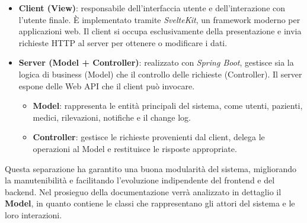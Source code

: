 \documentclass[a4paper]{article}
\begin{document}
\begin{itemize}
  \item \textbf{Client (View)}: responsabile dell’interfaccia utente e dell’interazione con 
  l’utente finale. È implementato tramite \textit{SvelteKit}, un framework moderno per applicazioni web. 
  Il client si occupa esclusivamente della presentazione e invia richieste HTTP al server per ottenere 
  o modificare i dati.
  \item \textbf{Server (Model + Controller)}: realizzato con \textit{Spring Boot}, gestisce sia 
  la logica di business (Model) che il controllo delle richieste (Controller). Il server espone delle 
  Web API che il client può invocare.
  \begin{itemize}
    \item \textbf{Model}: rappresenta le entità principali del sistema, come utenti, pazienti, medici, 
    rilevazioni, notifiche e il change log.
    \item \textbf{Controller}: gestisce le richieste provenienti dal client, delega 
    le operazioni al Model e restituisce le risposte appropriate.
  \end{itemize}
\end{itemize}
\noindent
Questa separazione ha garantito una buona modularità del sistema, migliorando la manutenibilità e 
facilitando l’evoluzione indipendente del frontend e del backend.
Nel prosieguo della documentazione verrà analizzato in dettaglio il \textbf{Model}, 
in quanto contiene le classi che rappresentano gli attori del sistema e le loro interazioni.
\end{document}
